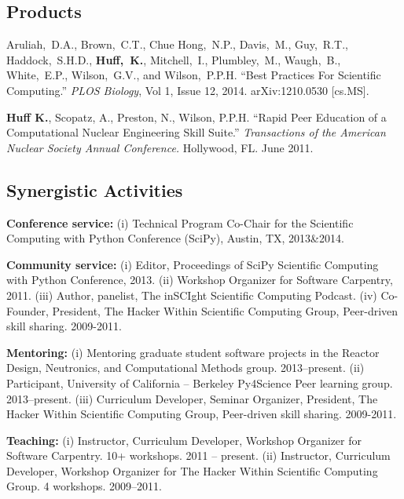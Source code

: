 \documentclass[svgnames,11pt]{article}
\begin{document}
\subsection{Products}

\begin{bibenum}[itemsep=5pt]
   \item Aruliah,~D.A., Brown,~C.T., Chue Hong,~N.P., Davis,~M., Guy,~R.T., 
          Haddock,~S.H.D., \textbf{Huff,~K.}, Mitchell,~I., Plumbley,~M., Waugh,~B., 
          White,~E.P., Wilson,~G.V., and Wilson,~P.P.H.  ``Best Practices For 
          Scientific Computing.'' \textsl{PLOS Biology}, Vol 1, Issue 12, 2014. 
          arXiv:1210.0530 [cs.MS].

   \item \textbf{Huff K.}, Scopatz, A., Preston, N., Wilson, P.P.H. ``Rapid
          Peer Education of a Computational Nuclear Engineering Skill Suite.''
          \emph{Transactions of the American Nuclear Society Annual Conference.}
          Hollywood, FL. June 2011.
\end{bibenum}

\subsection{Synergistic Activities}

\begin{bibenum}[itemsep=4pt]

    \item \textbf{Conference service:}
        (i) Technical Program Co-Chair for the Scientific Computing with Python 
        Conference (SciPy), Austin, TX, 2013\&2014.

    \item \textbf{Community service:}
        (i) Editor, Proceedings of SciPy Scientific Computing with Python 
        Conference, 2013.
        (ii) Workshop Organizer for Software Carpentry, 2011.
        (iii) Author, panelist, The inSCIght Scientific Computing Podcast.
        (iv) Co-Founder, President, The Hacker Within Scientific Computing Group, 
        Peer-driven skill sharing. 2009-2011.

    \item \textbf{Mentoring:}
        (i) Mentoring graduate student software projects in the Reactor Design, 
        Neutronics, and Computational Methods group. 2013--present.  
        (ii) Participant, University of California -- Berkeley Py4Science Peer 
        learning group. 2013--present. 
        (iii) Curriculum Developer, Seminar Organizer, President, The Hacker 
        Within Scientific Computing Group, Peer-driven skill sharing. 2009-2011.

    \item \textbf{Teaching:}
        (i) Instructor, Curriculum Developer, Workshop Organizer for 
        Software Carpentry. 10+ workshops. 2011 -- present.
        (ii) Instructor, Curriculum Developer, Workshop Organizer for 
        The Hacker Within Scientific Computing Group. 4 workshops. 2009--2011.


\end{bibenum}
\end{document}

